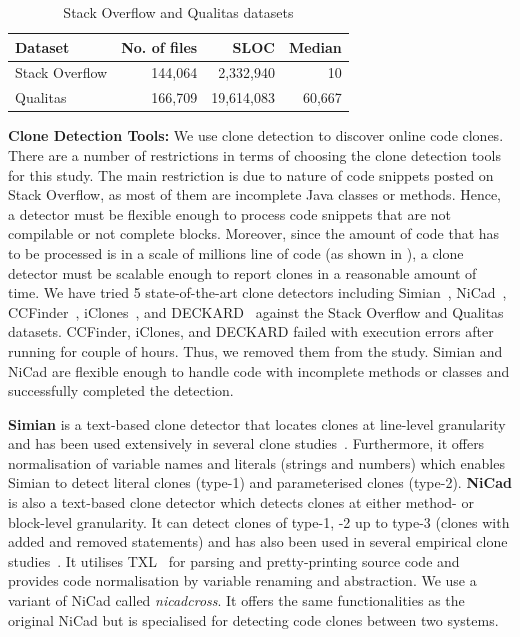 \documentclass[sigconf,review, anonymous]{acmart}
\begin{document}
\begin{table}
  \centering
  \caption{Stack Overflow and Qualitas datasets}
  \label{tab:datasets}
  \begin{tabular}{lrrr}
    \hline 
    Dataset & No. of files & SLOC & Median \\
    \hline
    Stack Overflow & 144,064 & 2,332,940 & 10 \\ 
    Qualitas &  166,709 & 19,614,083 & 60,667 \\ 
    \hline 
  \end{tabular} 
\end{table}

\textbf{Clone Detection Tools: }
We use clone detection to discover online code clones. 
There are a number of restrictions in terms of choosing the clone
detection tools for this study. The main restriction is due to nature
of code snippets posted on Stack Overflow, as most of them are
incomplete Java classes or methods. Hence, a detector must be flexible
enough to process code snippets that are not compilable or not
complete blocks. Moreover, since the amount of code that has to be
processed is in a scale of millions line of code (as shown in
), a clone detector must be scalable enough to
report clones in a reasonable amount of time. We have tried 5
state-of-the-art clone detectors including Simian~\cite{simian},
NiCad~\cite{Cordy,Roy2008}, CCFinder~\cite{Kamiya2002},
iClones~\cite{Gode2009}, and DECKARD~\cite{Jiang2007a} against the
Stack Overflow and Qualitas datasets. CCFinder, iClones, and DECKARD
failed with execution errors after running for couple of hours. Thus,
we removed them from the study. Simian and NiCad are flexible enough
to handle code with incomplete methods or classes and successfully
completed the detection.

\textbf{Simian} is a text-based clone detector that locates clones at
line-level granularity and has been used extensively in several clone
studies~\cite{Ragkhitwetsagul2016, Wang2013, Mondal2011, Cheung2015,
  Krinke2010}.
Furthermore, it offers normalisation of variable names and literals
(strings and numbers) which enables Simian to detect literal clones
(type-1) and parameterised clones (type-2). \textbf{NiCad} is also a
text-based clone detector which detects clones at either method- or
block-level granularity. It can detect clones of type-1, -2 up to
type-3 (clones with added and removed statements) and has
also been used in several empirical clone studies~\cite{Roy2008,
  Ragkhitwetsagul2016, Svajlenko2014, Wang2013, Mondal2011,
  Sajnani2016}. It utilises TXL~\cite{Cordy2006} for parsing and
pretty-printing source code and provides code normalisation by
variable renaming and abstraction. We use a variant of NiCad called
\textit{nicadcross}. It offers the same functionalities as the
original NiCad but is specialised for detecting code clones between
two systems. 
\end{document}
